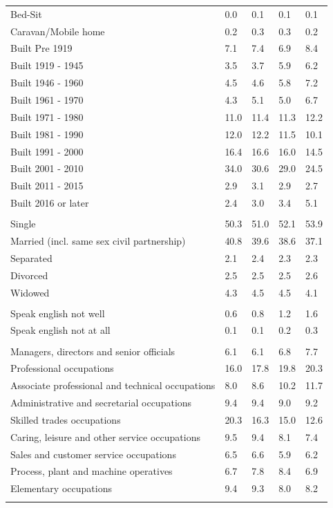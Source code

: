 \documentclass{article}
\begin{document}
\begin{table}[h]
\begin{tabular}{KTTTT}
Bed-Sit & 0.0& 0.1& 0.1& 0.1\\
Caravan/Mobile home & 0.2& 0.3& 0.3& 0.2\\
    \hline
Built Pre 1919 & 7.1& 7.4& 6.9& 8.4\\
Built 1919 - 1945 & 3.5& 3.7& 5.9& 6.2\\
Built  1946 - 1960 & 4.5& 4.6& 5.8& 7.2\\
Built  1961 - 1970 & 4.3& 5.1& 5.0& 6.7\\
Built  1971 - 1980 & 11.0& 11.4& 11.3& 12.2\\
Built  1981 - 1990 & 12.0& 12.2& 11.5& 10.1\\
Built  1991 - 2000 & 16.4& 16.6& 16.0& 14.5\\
Built  2001 - 2010 & 34.0& 30.6& 29.0& 24.5\\
Built  2011 - 2015 & 2.9& 3.1& 2.9& 2.7\\
Built  2016 or later & 2.4& 3.0& 3.4& 5.1\\
\hline
    \\
    \hline
Single & 50.3& 51.0& 52.1& 53.9\\
Married (incl. same sex civil partnership) & 40.8& 39.6& 38.6& 37.1\\
Separated  & 2.1& 2.4& 2.3& 2.3\\
Divorced  & 2.5& 2.5& 2.5& 2.6\\
Widowed & 4.3& 4.5& 4.5& 4.1\\
\hline
    \\ 
    \hline
Speak english not well & 0.6& 0.8& 1.2& 1.6\\
Speak english not at all & 0.1& 0.1& 0.2& 0.3\\
\hline
    \\
    \hline
Managers, directors and senior officials & 6.1& 6.1& 6.8& 7.7\\
Professional occupations & 16.0& 17.8& 19.8& 20.3\\
Associate professional and technical occupations &  8.0&  8.6& 10.2& 11.7\\
Administrative and secretarial occupations & 9.4& 9.4& 9.0& 9.2\\
Skilled trades occupations & 20.3& 16.3& 15.0& 12.6\\
Caring, leisure and other service occupations & 9.5& 9.4& 8.1& 7.4\\
Sales and customer service occupations & 6.5& 6.6& 5.9& 6.2\\
Process, plant and machine operatives & 6.7& 7.8& 8.4& 6.9\\
Elementary occupations & 9.4& 9.3& 8.0& 8.2\\
\hline
\end{tabular}
\end{table}
\end{document}
